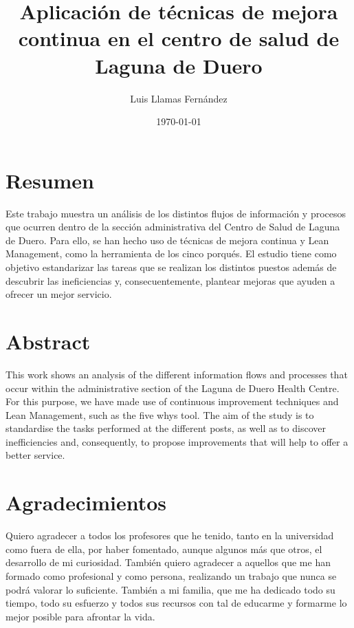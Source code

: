 \documentclass[12pt, a4paper, twoside, openright]{report}
\begin{document}
\title{Aplicación de técnicas de mejora continua en el centro de salud de Laguna de Duero}
\author{Luis Llamas Fernández}
\date{\today}
\maketitle

\thispagestyle{empty}

\chapter*{Resumen}
Este trabajo muestra un análisis de los distintos flujos de información y procesos que ocurren dentro de la sección 
administrativa del Centro de Salud de Laguna de Duero.
Para ello, se han hecho uso de técnicas de mejora continua y Lean 
Management, como la herramienta de los cinco porqués.
El estudio tiene como objetivo estandarizar las tareas que se realizan 
los distintos puestos además de descubrir las ineficiencias y, consecuentemente, plantear mejoras que ayuden a ofrecer un 
mejor servicio.

\setcounter{page}{1}

\chapter*{Abstract}
This work shows an analysis of the different information flows and processes that occur within the administrative section of the Laguna de Duero Health Centre.
For this purpose, we have made use of continuous improvement techniques and Lean  Management, such as the five whys tool.
The aim of the study is to standardise the tasks performed at the different posts, as well as to discover inefficiencies and, consequently, to propose improvements that will help to offer a better service.

\chapter*{Agradecimientos}
Quiero agradecer a todos los profesores que he tenido, tanto en la universidad como fuera de ella, por haber fomentado, aunque algunos más que otros, el desarrollo de mi curiosidad. También quiero agradecer a aquellos que me han formado como profesional y como persona, realizando un trabajo que nunca se podrá valorar lo suficiente. También a mi familia, que me ha dedicado todo su tiempo, todo su esfuerzo y todos sus recursos con tal de educarme y formarme lo mejor posible para afrontar la vida.
\end{document}
